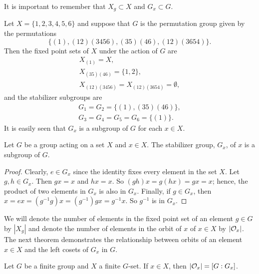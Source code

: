  
\vspace{2ex}
 
 
It is important to remember that $X_g \subset X$ and $G_x \subset G$. 
 
 
\medskip
 
 
\begin{example}
Let $X = \{1, 2, 3, 4, 5, 6\}$ and suppose that $G$ is the permutation
group given by the permutations 
$$
\{
(1), (1 2)(3 4 5 6), (3 5)(4 6), (1 2)( 3 6 5 4)
\}.
$$
Then the fixed point sets  of $X$ under the action of $G$ are
$$
\begin{array}{c}
X_{(1)}  =  X, \\
X_{(3 5)(4 6)}  =  \{1,2\}, \\
X_{(1 2)(3 4 5 6)}  = X_{(1 2)(3 6 5 4)}  =  \emptyset,
\end{array}
$$
and the stabilizer subgroups are
$$
\begin{array}{c}
G_1 =  G_2  =  \{(1), (3 5)(4 6) \}, \\
G_3  = G_4  = G_5  = G_6 =  \{(1)\}.
\end{array}
$$
It is easily  seen that  $G_x$ is a subgroup of $G$ for each $x \in
X$. 
\end{example}
 
 
\begin{proposition}
Let $G$ be a  group acting on a set $X$ and $x \in X$. The stabilizer
group, $G_x$, of $x$ is a subgroup of $G$. 
\end{proposition}
 
 
\begin{proof}
Clearly,  $e \in G_x$ since the identity fixes every element in the
set $X$. Let $g, h \in G_x$. Then $gx = x$ and $hx = x$. So $(gh)x =
g(hx) = gx = x$; hence, the product of two elements in $G_x$ is also
in $G_x$. Finally, if $g \in G_x$, then $x = ex = (g^{-1}g)x =
(g^{-1})gx = g^{-1} x$. So $g^{-1}$ is in $G_x$. 
\end{proof}
 
 
\vspace{2 ex }
 
 
We will denote the number of elements in the fixed point set of an
element $g \in G$ by $|X_g|$ and denote the number of elements in the
orbit of $x$ of $x \in X$ by $|{\cal O}_x|$. The next theorem
demonstrates the relationship between orbits of an element $x \in X$
and the left cosets of $G_x$ in $G$.
 
 
\begin{theorem}
Let $G$ be a finite group and $X$ a finite $G$-set. If $x \in X$,
then $|{\cal O}_x| = [G:G_x]$. 
\end{theorem}
 
